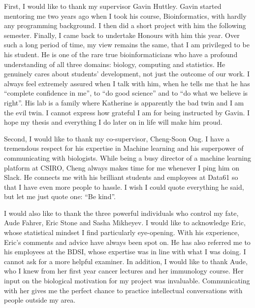 First, I would like to thank my supervisor Gavin Huttley. Gavin started mentoring me two years ago when I took his course, Bioinformatics, with hardly any programming background. I then did a short project with him the following semester. Finally, I came back to undertake Honours with him this year. Over such a long period of time, my view remains the same, that I am privileged to be his student. He is one of the rare true bioinformaticians who have a profound understanding of all three domains: biology, computing and statistics. He genuinely cares about students' development, not just the outcome of our work. I always feel extremely assured when I talk with him, when he tells me that he has ``complete confidence in me'', to ``do good science'' and to ``do what we believe is right''. His lab is a family where Katherine is apparently the bad twin and I am the evil twin. I cannot express how grateful I am for being instructed by Gavin. I hope my thesis and everything I do later on in life will make him proud.

Second, I would like to thank my co-supervisor, Cheng-Soon Ong. I have a tremendous respect for his expertise in Machine learning and his superpower of communicating with biologists. While being a busy director of a machine learning platform at CSIRO, Cheng always makes time for me whenever I ping him on Slack. He connects me with his brilliant students and employees at Data61 so that I have even more people to hassle. I wish I could quote everything he said, but let me just quote one: ``Be kind''.

I would also like to thank the three powerful individuals who control my fate, Aude Fahrer, Eric Stone and Sasha Mikheyev. I would like to acknowledge Eric, whose statistical mindset I find particularly eye-opening. With his experience, Eric's comments and advice have always been spot on. He has also referred me to his employees at the BDSI, whose expertise was in line with what I was doing. I cannot ask for a more helpful examiner. In addition, I would like to thank Aude, who I knew from her first year cancer lectures and her immunology course. Her input on the biological motivation for my project was invaluable. Communicating with her gives me the perfect chance to practice intellectual conversations with people outside my area.

